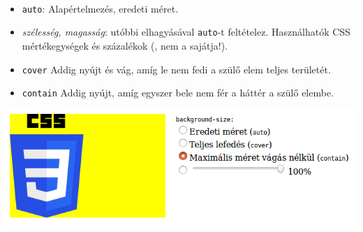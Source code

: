 \begin{frame}
  \begin{description}[m]
    \item[\texttt{background-size}] \hfill \\
      \begin{itemize}
        \item \texttt{auto}: Alapértelmezés, eredeti méret.
        \item \emph{szélesség, magasság}: utóbbi elhagyásával 
        \texttt{auto}-t feltételez. Használhatók CSS 
        mértékegységek és százalékok (, nem a sajátja!).
        \item \texttt{cover} Addig nyújt és vág, amíg le nem fedi a 
        szülő elem teljes területét.
        \item \texttt{contain} Addig nyújt, amíg egyszer bele nem fér a 
        háttér a szülő elembe.
      \end{itemize}
  \end{description}
  \vfill
  \begin{center}
    \includegraphics[scale=0.3]{meret.png}\\
  \end{center}
\end{frame}


